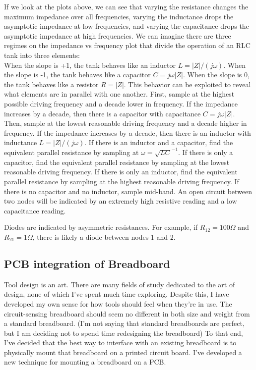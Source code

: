 \documentclass[11pt, a4paper]{article}
\begin{document}
If we look at the plots above, we can see that varying the resistance changes the maximum impedance over all frequencies, varying the inductance drops the asymptotic impedance at low frequencies, and varying the capacitance drops the asymptotic impedance at high frequencies.
We can imagine there are three regimes on the impedance vs frequency plot that divide the operation of an RLC tank into three elements:\\
When the slope is +1, the tank behaves like an inductor 
$L=|Z|/(j\omega)$.
When the slope is -1, the tank behaves like a capacitor
$C=j\omega |Z|$.
When the slope is 0, the tank behaves like a resistor
$R=|Z|$.
This behavior can be exploited to reveal what elements are in parallel with one another.
First, sample at the highest possible driving frequency and a decade lower in frequency.
If the impedance increases by a decade, then there is a capacitor with capacitance $C=j\omega |Z|$.
Then, sample at the lowest reasonable driving frequency and a decade higher in frequency.
If the impedance increases by a decade, then there is an inductor with inductance $L=|Z|/(j\omega)$.
If there is an inductor and a capacitor, find the equivalent parallel resistance by sampling at $\omega=\sqrt{LC}^{-1}$.
If there is only a capacitor, find the equivalent parallel resistance by sampling at the lowest reasonable driving frequency.
If there is only an inductor, find the equivalent parallel resistance by sampling at the highest reasonable driving frequency.
If there is no capacitor and no inductor, sample mid-band.
An open circuit between two nodes will be indicated by an extremely high resistive reading and a low capacitance reading.

Diodes are indicated by asymmetric resistances.
For example, if $R_{12}=100\Omega$ and $R_{21}=1\Omega$, there is likely a diode between nodes 1 and 2.





\subsection{PCB integration of Breadboard}

Tool design is an art.
There are many fields of study dedicated to the art of design, none of which I've spent much time exploring.
Despite this, I have developed my own sense for how tools should feel when they're in use.
The circuit-sensing breadboard should seem no different in both size and weight from a standard breadboard.
(I'm not saying that standard breadboards are perfect, but I am deciding not to spend time redesigning the breadboard)
To that end, I've decided that the best way to interface with an existing breadboard is to physically mount that breadboard on a printed circuit board.
I've developed a new technique for mounting a breadboard on a PCB.
\end{document}
